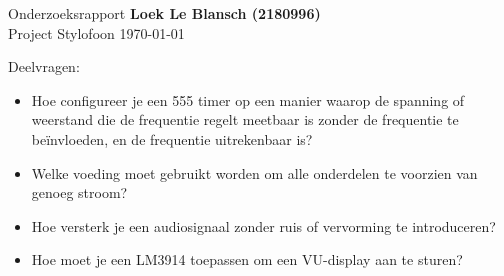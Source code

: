 \documentclass[12pt, a4paper, dutch]{article}
\begin{document}
Onderzoeksrapport \hfill \textbf{Loek Le Blansch (2180996)}\\
Project Stylofoon \hfill \today
\medskip

Deelvragen:

\begin{itemize}
	\item Hoe configureer je een 555 timer op een manier waarop de spanning of
		weerstand die de frequentie regelt meetbaar is zonder de frequentie te
		be\"invloeden, en de frequentie uitrekenbaar is?
	\item Welke voeding moet gebruikt worden om alle onderdelen te voorzien van genoeg
		stroom?
	\item Hoe versterk je een audiosignaal zonder ruis of vervorming te introduceren?
	\item Hoe moet je een LM3914 toepassen om een VU-display aan te sturen?
	
\end{itemize}
\end{document}
